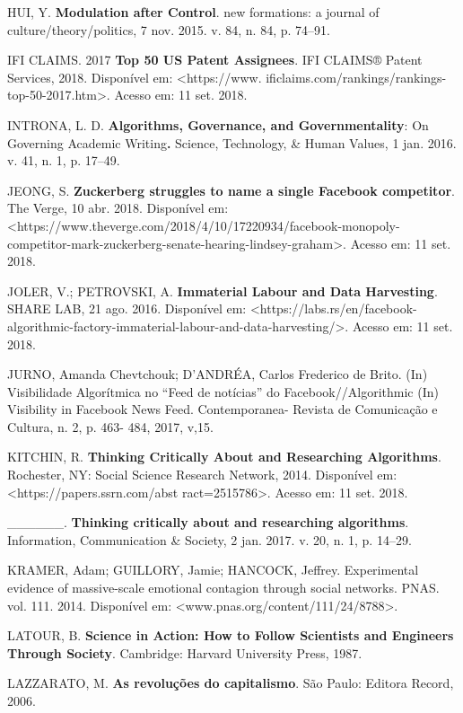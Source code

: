 HUI, Y. \textbf{Modulation after Control}. new formations: a journal of
culture/theory/politics, 7 nov. 2015. v. 84, n. 84, p. 74--91.

IFI CLAIMS. 2017 \textbf{Top 50 US Patent Assignees}. IFI CLAIMS® Patent
Services, 2018. Disponível em:
\textless{}https://www.
ificlaims.com/rankings/rankings-top-50-2017.htm\textgreater{}.
Acesso em: 11 set. 2018.

INTRONA, L. D. \textbf{Algorithms, Governance, and Governmentality}: On
Governing Academic Writing\textbf{.} Science, Technology, \& Human
Values, 1 jan. 2016. v. 41, n. 1, p. 17--49.

JEONG, S. \textbf{Zuckerberg struggles to name a single Facebook
competitor}. The Verge, 10 abr. 2018. Disponível em:
\textless{}https://www.theverge.com/2018/4/10/17220934/facebook-monopoly-competitor-mark-zuckerberg-senate-hearing-lindsey-graham\textgreater{}.
Acesso em: 11 set. 2018.

JOLER, V.; PETROVSKI, A. \textbf{Immaterial Labour and Data Harvesting}.
SHARE LAB, 21 ago. 2016. Disponível em:
\textless{}https://labs.rs/en/facebook-algorithmic-factory-immaterial-labour-and-data-harvesting/\textgreater{}.
Acesso em: 11 set. 2018.

JURNO, Amanda Chevtchouk; D’ANDRÉA, Carlos Frederico de Brito. (In) Visibilidade Algorítmica 
no “Feed de notícias” do Facebook//Algorithmic (In) Visibility in Facebook News Feed. 
Contemporanea- Revista de Comunicação e Cultura, n. 2, p. 463- 484, 2017, v,15.

KITCHIN, R. \textbf{Thinking Critically About and Researching
Algorithms}. Rochester, NY: Social Science Research Network, 2014.
Disponível em:
\textless{}https://papers.ssrn.com/abst
ract=2515786\textgreater{}.
Acesso em: 11 set. 2018.

\_\_\_\_\_\_. \textbf{Thinking critically about and researching
algorithms}. Information, Communication \& Society, 2 jan. 2017. v. 20,
n. 1, p. 14--29.

KRAMER, Adam; GUILLORY, Jamie; HANCOCK, Jeffrey. Experimental evidence
of massive-scale emotional contagion through social networks. PNAS. vol.
111. 2014. Disponível em:
\textless{}www.pnas.org/content/111/24/8788\textgreater{}.

LATOUR, B. \textbf{Science in Action: How to Follow Scientists and
Engineers Through Society}. Cambridge: Harvard University Press, 1987.

LAZZARATO, M. \textbf{As revoluções do capitalismo}. São Paulo: Editora
Record, 2006.

